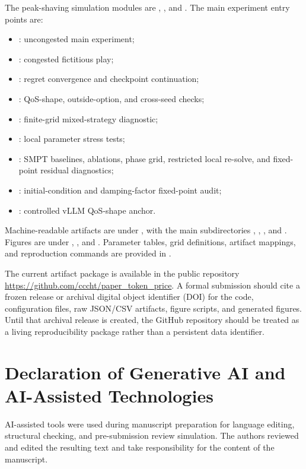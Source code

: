 \documentclass[11pt,a4paper]{article}
\begin{document}
The peak-shaving simulation modules are ,
, and
. The main experiment entry points are:
\begin{itemize}[leftmargin=2em]
  \item {}: uncongested main experiment;
  \item {}: congested fictitious play;
  \item {}: regret convergence and checkpoint continuation;
  \item {}: QoS-shape, outside-option, and cross-seed checks;
  \item {}: finite-grid mixed-strategy diagnostic;
  \item {}: local parameter stress tests;
  \item {}: SMPT baselines, ablations, phase grid, restricted local re-solve, and fixed-point residual diagnostics;
  \item {}: initial-condition and damping-factor fixed-point audit;
  \item {}: controlled vLLM QoS-shape anchor.
\end{itemize}
Machine-readable artifacts are under , with the main subdirectories
, , , and . Figures are under
, , and . Parameter tables,
grid definitions, artifact mappings, and reproduction commands are provided in
.

The current artifact package is available in the public repository \url{https://github.com/cccht/paper_token_price}. A formal submission should cite a frozen release or archival digital object identifier (DOI) for the code, configuration files, raw JSON/CSV artifacts, figure scripts, and generated figures. Until that archival release is created, the GitHub repository should be treated as a living reproducibility package rather than a persistent data identifier.

\section*{Declaration of Generative AI and AI-Assisted Technologies}

AI-assisted tools were used during manuscript preparation for language editing, structural checking, and pre-submission review simulation. The authors reviewed and edited the resulting text and take responsibility for the content of the manuscript.

\small


\end{document}
